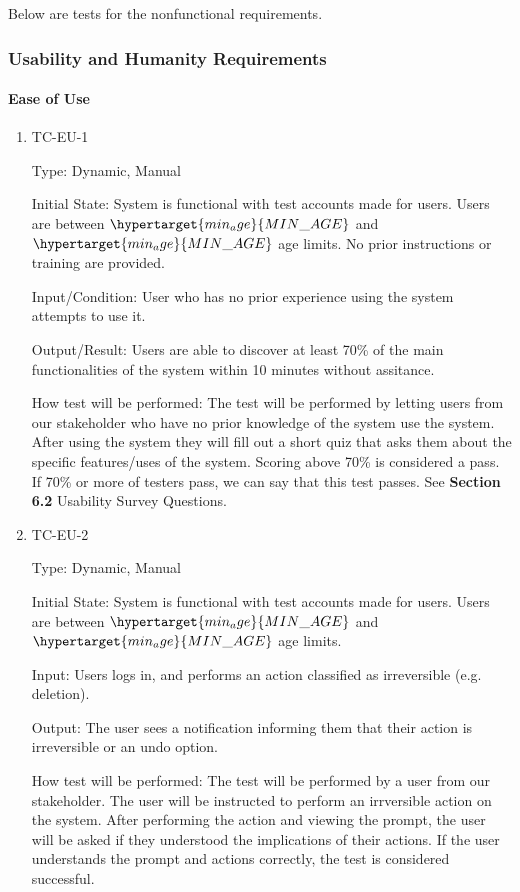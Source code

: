 \documentclass[12pt, titlepage]{article}
\begin{document}
Below are tests for the nonfunctional requirements.

\subsubsection{Usability and Humanity Requirements}

\paragraph{Ease of Use}

\begin{enumerate}

  \item{TC-EU-1\\}

    Type: Dynamic, Manual

    Initial State: System is functional with test accounts made for users. Users
    are between $\hypertarget{min_age}{MIN\_AGE}$ and
    $\hypertarget{min_age}{MIN\_AGE}$ age limits. No prior instructions or
    training are provided.

    Input/Condition: User who has no prior experience using the system attempts
    to use it.

    Output/Result: Users are able to discover at least 70\% of the main
    functionalities of the system within 10 minutes without assitance.

    How test will be performed: The test will be performed by letting users from
    our stakeholder who have no prior knowledge of the system use the system.
    After using the system they will fill out a short quiz that asks them
    about the specific features/uses of the system. Scoring above 70\% is
    considered a pass. If 70\% or more of testers pass, we can say that this
    test passes. See \textbf{Section 6.2} Usability Survey Questions.

  \item{TC-EU-2\\}

    Type: Dynamic, Manual

    Initial State: System is functional with test accounts made for users. Users
    are between $\hypertarget{min_age}{MIN\_AGE}$ and
    $\hypertarget{min_age}{MIN\_AGE}$ age limits.

    Input: Users logs in, and performs an action classified as irreversible
    (e.g. deletion).

    Output: The user sees a notification informing them that their action is
    irreversible or an undo option.

    How test will be performed: The test will be performed by a user from our
    stakeholder. The user will be instructed to perform an irrversible action on
    the system. After performing the action and viewing the prompt, the user
    will be asked if they understood the implications of their actions. If the
    user understands the prompt and actions correctly, the test is considered
    successful.

\end{enumerate}
\end{document}

